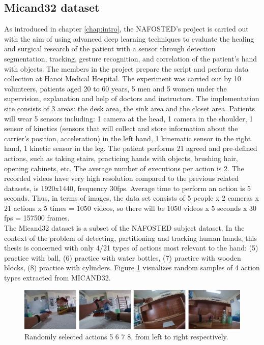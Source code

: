 \subsection{Micand32 dataset} \label{subsec:micand32}
As introduced in chapter \ref{chap:intro}, the NAFOSTED’s project is carried out with the aim of using advanced deep learning techniques to evaluate the healing and surgical research of the patient with a sensor through detection segmentation, tracking, gesture recognition, and correlation of the patient's hand with objects. The members in the project prepare the script and perform data collection at Hanoi Medical Hospital. The experiment was carried out by 10 volunteers, patients aged 20 to 60 years, 5 men and 5 women under the supervision, explanation and help of doctors and instructors. The implementation site consists of 3 areas: the desk area, the sink area and the closet area. Patients will wear 5 sensors including: 1 camera at the head, 1 camera in the shoulder, 1 sensor of kinetics (sensors that will collect and store information about the carrier's position, acceleration) in the left hand, 1 kinematic sensor in the right hand, 1 kinetic sensor in the leg. The patient performs 21 agreed and pre-defined actions, such as taking stairs, practicing hands with objects, brushing hair, opening cabinets, etc. The average number of executions per action is 2. The recorded videos have very high resolution compared to the previous related datasets, is 1920x1440, frequency 30fps. Average time to perform an action is 5 seconds. Thus, in terms of images, the data set consists of 5 people x 2 cameras x 21 actions x 5 times = 1050 videos, so there will be 1050 videos x 5 seconds x 30 fps = 157500 frames.
\\The Micand32 dataset is a subset of the NAFOSTED subject dataset. In the context of the problem of detecting, partitioning and tracking human hands, this thesis is concerned with only 4/21 types of actions most relevant to the hand: (5) practice with ball, (6) practice with water bottles, (7) practice with wooden blocks, (8) practice with cylinders. Figure \ref{fig:micand32} visualizes random samples of 4 action types extracted from MICAND32.
\begin{figure}
	\centerline{\includegraphics[width=1\linewidth]{Figs/micand32.png}}
	\caption{Randomly selected actions 5 6 7 8, from left to right respectively.}
	\label{fig:micand32}
\end{figure}
